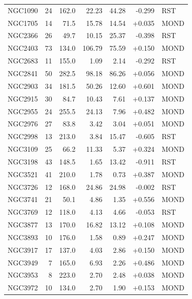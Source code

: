 \documentclass[11pt,a4paper]{article}
\begin{document}
\begin{longtable}{lrrrrrl}
NGC1090              &  24 &  162.0 &    22.23 &    44.28 & -0.299 & RST \\
NGC1705              &  14 &   71.5 &    15.78 &    14.54 & +0.035 & MOND \\
NGC2366              &  26 &   49.7 &    10.15 &    25.37 & -0.398 & RST \\
NGC2403              &  73 &  134.0 &   106.79 &    75.59 & +0.150 & MOND \\
NGC2683              &  11 &  155.0 &     1.09 &     2.14 & -0.292 & RST \\
NGC2841              &  50 &  282.5 &    98.18 &    86.26 & +0.056 & MOND \\
NGC2903              &  34 &  181.5 &    50.26 &    12.60 & +0.601 & MOND \\
NGC2915              &  30 &   84.7 &    10.43 &     7.61 & +0.137 & MOND \\
NGC2955              &  24 &  255.5 &    24.13 &     7.96 & +0.482 & MOND \\
NGC2976              &  27 &   83.8 &     3.42 &     3.04 & +0.051 & MOND \\
NGC2998              &  13 &  213.0 &     3.84 &    15.47 & -0.605 & RST \\
NGC3109              &  25 &   66.2 &    11.33 &     5.37 & +0.324 & MOND \\
NGC3198              &  43 &  148.5 &     1.65 &    13.42 & -0.911 & RST \\
NGC3521              &  41 &  210.0 &     1.78 &     0.73 & +0.387 & MOND \\
NGC3726              &  12 &  168.0 &    24.86 &    24.98 & -0.002 & RST \\
NGC3741              &  21 &   50.1 &     4.86 &     1.35 & +0.556 & MOND \\
NGC3769              &  12 &  118.0 &     4.13 &     4.66 & -0.053 & RST \\
NGC3877              &  13 &  170.0 &    16.82 &    13.12 & +0.108 & MOND \\
NGC3893              &  10 &  176.0 &     1.58 &     0.89 & +0.247 & MOND \\
NGC3917              &  17 &  137.0 &     4.03 &     2.86 & +0.150 & MOND \\
NGC3949              &   7 &  165.0 &     6.93 &     2.26 & +0.486 & MOND \\
NGC3953              &   8 &  223.0 &     2.70 &     2.48 & +0.038 & MOND \\
NGC3972              &  10 &  134.0 &     2.70 &     1.90 & +0.153 & MOND \\

\end{longtable}
\end{document}
